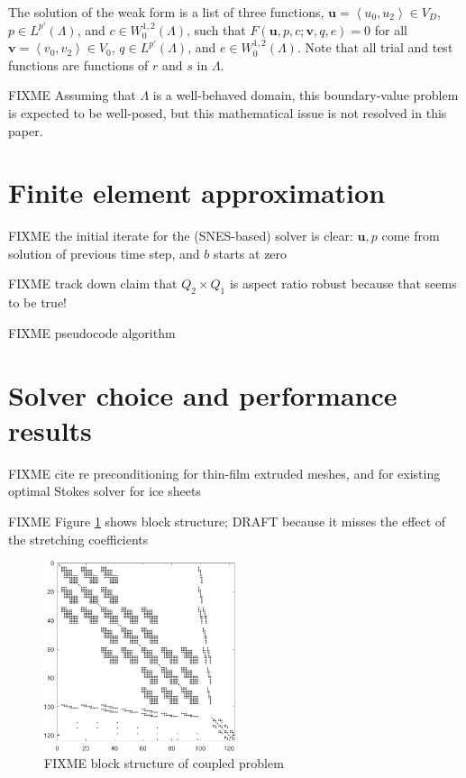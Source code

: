\documentclass[letterpaper,final,12pt,reqno]{amsart}
\newcommand{\bu}{\mathbf{u}}
\newcommand{\bv}{\mathbf{v}}
\begin{document}
The solution of the weak form is a list of three functions, $\bu = \left<u_0,u_2\right> \in V_D$, $p\in L^{p'}(\Lambda)$, and $c\in W^{1,2}_0(\Lambda)$, such that $F(\bu,p,c;\bv,q,e) = 0$ for all $\bv = \left<v_0,v_2\right> \in V_0$,  $q\in L^{p'}(\Lambda)$, and $e \in W^{1,2}_0(\Lambda)$.  Note that all trial and test functions are functions of $r$ and $s$ in $\Lambda$.

FIXME Assuming that $\Lambda$ is a well-behaved domain, this boundary-value problem is expected to be well-posed, but this mathematical issue is not resolved in this paper.


\section{Finite element approximation}  \label{sec:finiteelement}

FIXME the initial iterate for the (SNES-based) solver is clear: $\bu,p$ come from solution of previous time step, and $b$ starts at zero

FIXME track down \cite{IsaacStadlerGhattas2015} claim that $Q_2\times Q_1$ is aspect ratio robust because that seems to be true!

FIXME pseudocode algorithm


\section{Solver choice and performance results} \label{sec:results}

FIXME cite \cite{Tuminaroetal2016} re preconditioning for thin-film extruded meshes, and \cite{IsaacStadlerGhattas2015} for existing optimal Stokes solver for ice sheets

FIXME Figure \ref{fig:blockstructure} shows block structure; DRAFT because it misses the effect of the stretching coefficients

\begin{figure}[ht]
\begin{center}
\includegraphics[width=0.5\textwidth]{figs/coarsespy.pdf}
\end{center}
\caption{FIXME block structure of coupled problem}
\label{fig:blockstructure}
\end{figure}
\end{document}
